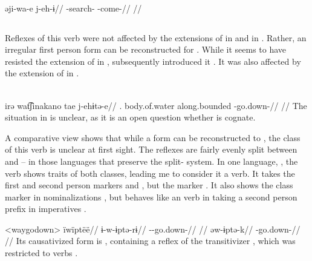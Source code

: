 \carijo \parencite[][102]{guerrero2019carijo}\\
\begingl
\gla əji-wa-e j-eh-ɨ//
\glb {}-search- -come-//
\glft {}//
\endgl
\xe

\subsection{ }
\label{sec:godown}
Reflexes of this verb were not affected by the extensions of  in \PTir {} and  in \akuriyo {}.
Rather, an irregular first person form  can be reconstructed for \PTir.
While it seems to have resisted the extension of  in \PPek, \bakairi subsequently introduced it .
It was also affected by the extension of  in \carijo {}.

\carijo {}\\
\begingl
\gla irə wat͡ʃinakano tae j-ehɨtə-e//
\glb {}. body.of.water along.bounded -go.down-//
\glft {}//
\endgl
\xe
%
The situation in \yukpa is unclear, as it is an open question whether   \parencite{meira2003primeras} is cognate.

A comparative view  shows that while a form  can be reconstructed to \PC, the class of this verb is unclear at first sight.
The reflexes are fairly evenly split between  and  -- in those languages that preserve the split- system.
In one language, \wayana, the verb shows traits of both classes, leading me to consider it a  verb.
It takes the first and second person  markers  and  \parencite[200]{wayanatavares2005}, but the  marker  \parencite[206]{wayanatavares2005}.
It also shows the  class marker  in nominalizations , but behaves like an  verb in taking a second person prefix in imperatives .

\pex<waygodown>\wayana \parencite[][200]{wayanatavares2005}
\begingl
\glpreamble ïwïptëë//
\gla ɨ-w-ɨptə-rɨ//
\glb {}--go.down-//
\glft {}//
\endgl
{}
\begingl
\gla əw-ɨptə-k//
\glb {}-go.down-//
\glft {}//
\endgl
\xe
%
Its causativized form is  \parencite[255]{wayanatavares2005}, containing a reflex of the transitivizer , which was restricted to  verbs \parencite{gildea2019overview}.

